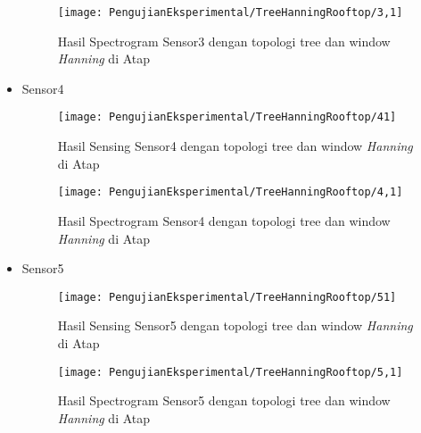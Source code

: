 \begin{itemize}
\begin{figure}[H]
	\centering
	\texttt{[image: PengujianEksperimental/TreeHanningRooftop/3,1]}
	\caption[Hasil Spectrogram Sensor3 dengan topologi tree dan window {\it Hanning} di Atap]{Hasil Spectrogram Sensor3 dengan topologi tree dan window {\it Hanning} di Atap} 
	\label{fig:hasilAtapTreeHann3,1}
\end{figure}

\item Sensor4
\begin{figure}[H]
	\centering
	\texttt{[image: PengujianEksperimental/TreeHanningRooftop/41]}
	\caption[Hasil Sensing Sensor4 dengan topologi tree dan window {\it Hanning} di Atap]{Hasil Sensing Sensor4 dengan topologi tree dan window {\it Hanning} di Atap} 
	\label{fig:hasilAtapTreeHann41}
\end{figure}

\begin{figure}[H]
	\centering
	\texttt{[image: PengujianEksperimental/TreeHanningRooftop/4,1]}
	\caption[Hasil Spectrogram Sensor4 dengan topologi tree dan window {\it Hanning} di Atap]{Hasil Spectrogram Sensor4 dengan topologi tree dan window {\it Hanning} di Atap} 
	\label{fig:hasilAtapTreeHann4,1}
\end{figure}

\item Sensor5
\begin{figure}[H]
	\centering
	\texttt{[image: PengujianEksperimental/TreeHanningRooftop/51]}
	\caption[Hasil Sensing Sensor5 dengan topologi tree dan window {\it Hanning} di Atap]{Hasil Sensing Sensor5 dengan topologi tree dan window {\it Hanning} di Atap} 
	\label{fig:hasilAtapTreeHann51}
\end{figure}

\begin{figure}[H]
	\centering
	\texttt{[image: PengujianEksperimental/TreeHanningRooftop/5,1]}
	\caption[Hasil Spectrogram Sensor5 dengan topologi tree dan window {\it Hanning} di Atap]{Hasil Spectrogram Sensor5 dengan topologi tree dan window {\it Hanning} di Atap} 
	\label{fig:hasilAtapTreeHann5,1}
\end{figure}
\end{itemize}

